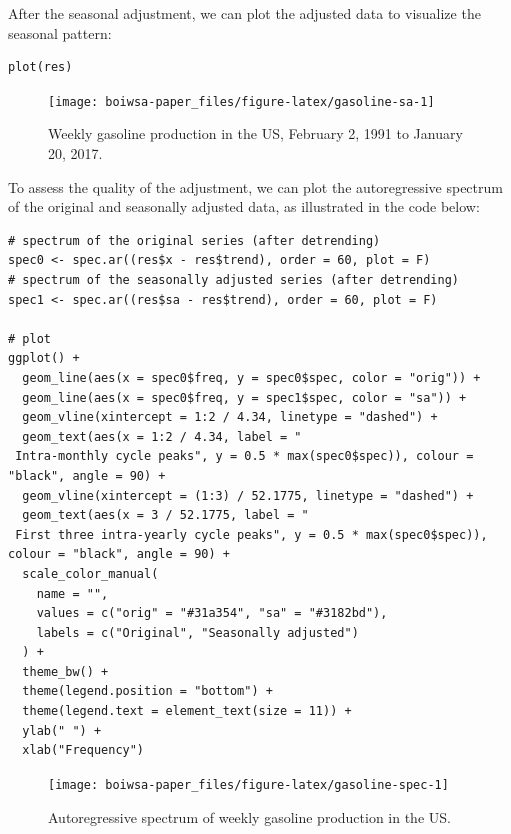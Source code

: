 After the seasonal adjustment, we can plot the adjusted data to visualize the seasonal pattern:

\begin{verbatim}
plot(res)
\end{verbatim}

\begin{figure}[H]

{\centering \texttt{[image: boiwsa-paper\_files/figure-latex/gasoline-sa-1]} 

}

\caption{Weekly gasoline production in the US, February 2, 1991 to January 20, 2017.}\label{fig:gasoline-sa}
\end{figure}

To assess the quality of the adjustment, we can plot the autoregressive spectrum of the original and seasonally adjusted data, as illustrated in the code below:

\begin{verbatim}
# spectrum of the original series (after detrending)
spec0 <- spec.ar((res$x - res$trend), order = 60, plot = F)
# spectrum of the seasonally adjusted series (after detrending)
spec1 <- spec.ar((res$sa - res$trend), order = 60, plot = F)

# plot
ggplot() +
  geom_line(aes(x = spec0$freq, y = spec0$spec, color = "orig")) +
  geom_line(aes(x = spec0$freq, y = spec1$spec, color = "sa")) +
  geom_vline(xintercept = 1:2 / 4.34, linetype = "dashed") +
  geom_text(aes(x = 1:2 / 4.34, label = "
 Intra-monthly cycle peaks", y = 0.5 * max(spec0$spec)), colour = "black", angle = 90) +
  geom_vline(xintercept = (1:3) / 52.1775, linetype = "dashed") +
  geom_text(aes(x = 3 / 52.1775, label = "
 First three intra-yearly cycle peaks", y = 0.5 * max(spec0$spec)), colour = "black", angle = 90) +
  scale_color_manual(
    name = "",
    values = c("orig" = "#31a354", "sa" = "#3182bd"),
    labels = c("Original", "Seasonally adjusted")
  ) +
  theme_bw() +
  theme(legend.position = "bottom") +
  theme(legend.text = element_text(size = 11)) +
  ylab(" ") +
  xlab("Frequency")
\end{verbatim}

\begin{figure}[H]

{\centering \texttt{[image: boiwsa-paper\_files/figure-latex/gasoline-spec-1]} 

}

\caption{Autoregressive spectrum of weekly gasoline production in the US.}\label{fig:gasoline-spec}
\end{figure}

